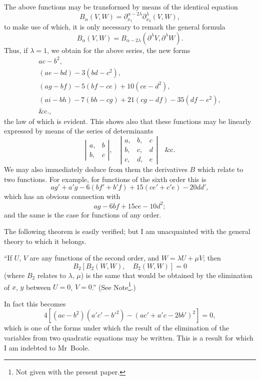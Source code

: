 \documentclass[11pt,a4paper]{book}
\begin{document}
\newpage
The above functions may be transformed by means of the identical equation
\[
B_{\alpha}(V, W) = \partial_{x_1}^{\alpha-2\lambda} \partial_{x_2}^{\lambda} (V, W),
\]
to make use of which, it is only necessary to remark the general formula
\[
B_{\alpha}(V, W) = B_{\alpha - 2\lambda}(\partial^{\lambda} V, \partial^{\lambda} W).
\]
Thus, if $\lambda=1$, we obtain for the above series, the new forms
\begin{align*}
ac - b^2, \\
(ae - bd) - 3(bd - c^2), \\
(ag - bf) - 5(bf - ce) + 10(ce - d^2), \\
(ai - bh) - 7(bh - cg) + 21(cg - df) - 35(df - e^2), \\
\&\text{c.},
\end{align*}
the law of which is evident. This shows also that these functions may be linearly
expressed by means of the series of determinants
\[
\left|\begin{array}{cc}
a, & b \\
b, & c
\end{array}\right|, \quad
\left|\begin{array}{ccc}
a, & b, & c \\
b, & c, & d \\
c, & d, & e
\end{array}\right|
\quad \&\text{c.}
\]
We may also immediately deduce from them the derivatives $B$ which relate to two
functions. For example, for functions of the sixth order this is
\[
ag' + a'g - 6(bf' + b'f) + 15(ce' + c'e) - 20dd',
\]
which has an obvious connection with
\[
ag - 6bf + 15ce - 10d^2;
\]
and the same is the case for functions of any order.

The following theorem is easily verified; but I am unacquainted with the general
theory to which it belongs.

``If $U$, $V$ are any functions of the second order, and $W = \lambda U + \mu V$; then
\[
B_2[B_2(W, W), \quad B_2(W, W)] = 0
\]
(where $B_2$ relates to $\lambda$, $\mu$) is the same that would be obtained by the elimination of
$x$, $y$ between $U=0$, $V=0$.'' (See Note\footnote{Not given with the present paper.}.)

In fact this becomes
\[
4[(ac - b^2)(a'c' - b'^2) - (ac' + a'c - 2bb')^2] = 0,
\]
which is one of the forms under which the result of the elimination of the variables
from two quadratic equations may be written. This is a result for which I am
indebted to Mr~Boole.
\end{document}
